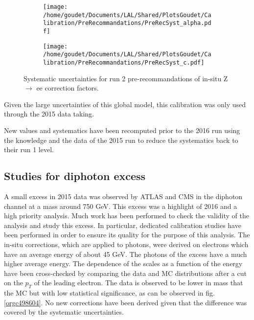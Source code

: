 \begin{figure}
\begin{subfigure}[t]{0.49\linewidth}
\begin{center}
\texttt{[image: /home/goudet/Documents/LAL/Shared/PlotsGoudet/Calibration/PreRecommandations/PreRecSyst\_alpha.pdf]}
\end{center}
\end{subfigure}
\begin{subfigure}[t]{0.49\linewidth}
\begin{center}
\texttt{[image: /home/goudet/Documents/LAL/Shared/PlotsGoudet/Calibration/PreRecommandations/PreRecSyst\_c.pdf]}
\end{center}
\end{subfigure}
\caption{\label{org95bdf2b}
Systematic uncertainties for run 2 pre-recommandations of in-situ Z\(\rightarrow\) ee correction factors.}
\end{figure}

Given the large uncertainties of this global model, this calibration was only used through the 2015 data taking.

New values and systematics have been recomputed prior to the 2016 run using the knowledge and the data of the 2015 run to reduce the systematics back to their run 1 level.

\subsection{Studies for diphoton excess}
\label{sec:orgeabf89e}
\label{sec:calibration_scaleForExcess}

A small excess in 2015 data was observed by ATLAS \cite{ATLAS-CONF-2015-081} and CMS \cite{CMS-PAS-EXO-15-004} in the diphoton channel at a mass around 750 GeV.
This excess was a highlight of 2016 and a high priority analysis.
Much work has been performed to check the validity of the analysis and study this excess.
In particular, dedicated calibration studies have been performed in order to ensure its quality for the purpose of this analysis.
The in-situ corrections, which are applied to photons, were derived on electrons which have an average energy of about 45 GeV.
The photons of the excess have a much higher average energy.
The dependence of the scales as a function of the energy have been cross-checked by comparing the data and MC distributions after a cut on the $p_T$ of the leading electron.
The data is observed to be lower in mass that the MC but with low statistical significance, as can be observed in fig. \ref{orgc498604}.
No new corrections have been derived given that the difference was covered by the systematic uncertainties.

